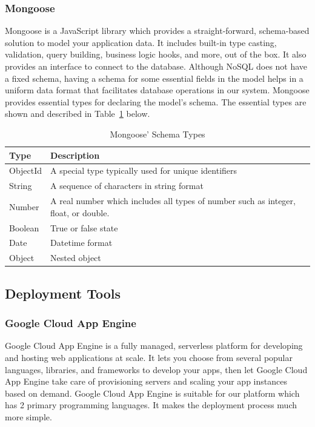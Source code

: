 \documentclass[12pt,oneside,openright,a4paper]{cpe-english-project}
\begin{document}
\subsubsection{Mongoose}

Mongoose is a JavaScript library which provides a straight-forward, schema-based solution to model your application data. It includes built-in type casting, validation, query building, business logic hooks, and more, out of the box. \cite{mongoose} It also provides an interface to connect to the database. Although NoSQL does not have a fixed schema, having a schema for some essential fields in the model helps in a uniform data format that facilitates database operations in our system. Mongoose provides essential types for declaring the model’s schema. The essential types are shown and described in Table~\ref{tbl:2MongooseSchemaTypes} below.

\begin{table}[!h]
\caption{Mongoose’ Schema Types}\label{tbl:2MongooseSchemaTypes}
\begin{tabularx}{\textwidth}{l|X} \hline\hline
Type & Description \\ \hline\hline
ObjectId & A special type typically used for unique identifiers \\ \hline
String & A sequence of characters in string format \\ \hline
Number & A real number which includes all types of number such as integer, float, or double. \\ \hline
Boolean & True or false state \\ \hline
Date & Datetime format \\ \hline
Object & Nested object \\ \hline\hline
\end{tabularx}
\end{table}


\subsection{Deployment Tools}

\subsubsection{Google Cloud App Engine}

Google Cloud App Engine is a fully managed, serverless platform for developing and hosting web applications at scale. It lets you choose from several popular languages, libraries, and frameworks to develop your apps, then let Google Cloud App Engine take care of provisioning servers and scaling your app instances based on demand. \cite{GoogleAppEngineDocumentation} Google Cloud App Engine is suitable for our platform which has 2 primary programming languages. It makes the deployment process much more simple.
\end{document}
